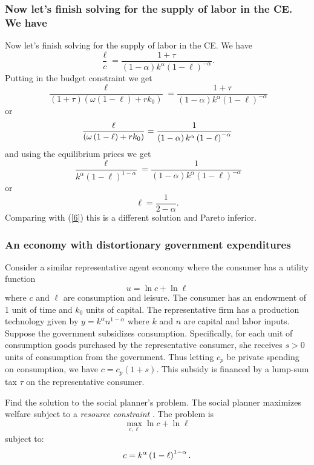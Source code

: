 \documentclass[aspectratio=169]{ltx-talk}
\begin{document}
\begin{frame}
\frametitle{Now let{'}s finish solving for the supply of labor in the CE. We have}
Now let's finish solving for the supply of labor in the CE. We have 
\begin{equation*}
\frac{\ell }{c}=\frac{1+\tau }{\left( 1-\alpha \right) k^{\alpha }\left(
1-\ell \right) ^{-\alpha }}.
\end{equation*}%
Putting in the budget constraint we get%
\begin{equation*}
\frac{\ell }{\left( 1+\tau \right) \left( \omega \left( 1-\ell \right)
+rk_{0}\right) }=\frac{1+\tau }{\left( 1-\alpha \right) k^{\alpha }\left(
1-\ell \right) ^{-\alpha }}
\end{equation*}%
or%
\begin{equation*}
\frac{\ell }{\left( \omega \left( 1-\ell \right) +rk_{0}\right) }=\frac{1}{%
\left( 1-\alpha \right) k^{\alpha }\left( 1-\ell \right) ^{-\alpha }}
\end{equation*}%
and using the equilibrium prices we get%
\begin{equation*}
\frac{\ell }{k^{\alpha }\left( 1-\ell \right) ^{1-\alpha }}=\frac{1}{\left(
1-\alpha \right) k^{\alpha }\left( 1-\ell \right) ^{-\alpha }}
\end{equation*}%
or%
\begin{equation}
\ell =\frac{1}{2-\alpha }.  \label{9}
\end{equation}%
Comparing with (\ref{6}) this is a different solution and Pareto
inferior.
\end{frame}

\begin{frame}
\frametitle{An economy with distortionary government expenditures}
Consider a similar representative agent economy where the consumer has a
utility function 
\begin{equation}
u=\ln c+\ln \ell  \label{u3}
\end{equation}%
where $c$ and $\ell $ are consumption and leisure. The consumer has an
endowment of 1 unit of time and $k_{0}$ units of capital. The representative
firm has a production technology given by $y=k^{\alpha }n^{1-\alpha }$ where 
$k$ and $n$ are capital and labor inputs. Suppose the government subsidizes
consumption. Specifically, for each unit of consumption goods purchased by
the representative consumer, she receives $s>0$ units of consumption from
the government. Thus letting $c_{p}$ be private spending on consumption, we
have $c=c_{p}\left( 1+s\right) .$ This subsidy is financed by a lump-sum tax 
$\tau $ on the representative consumer.

Find the solution to the social planner's problem.\newline
The social planner maximizes welfare subject to a \textit{resource constraint%
}. The problem is 
\begin{equation*}
\underset{c,\ell }{\max }\ln c+\ln \ell
\end{equation*}%
subject to:%
\begin{equation}
c=k^{\alpha }\left( 1-\ell \right) ^{1-\alpha }.  \notag
\end{equation}%
\end{frame}
\end{document}
